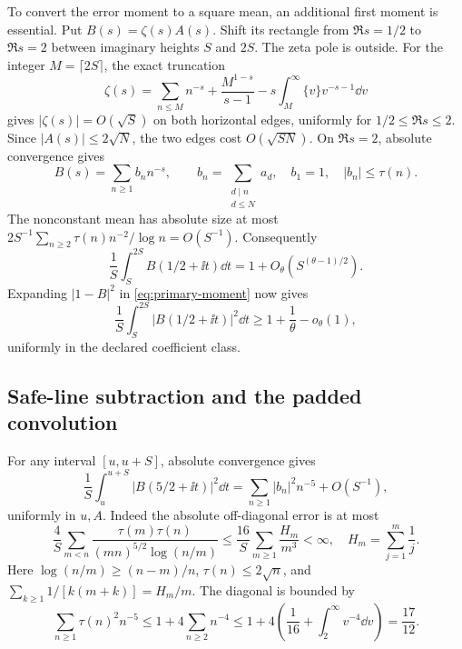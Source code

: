To convert the error moment to a square mean, an additional first
moment is essential. Put \(B(s)=\zeta(s)A(s)\).
Shift its rectangle from \(\Re s=1/2\) to \(\Re s=2\) between
imaginary heights \(S\) and \(2S\). The zeta pole is outside.
For the integer \(M=\lceil2S\rceil\), the exact truncation
\[
 \zeta(s)=\sum_{n\le M}n^{-s}+\frac{M^{1-s}}{s-1}
         -s\int_M^\infty\{v\}v^{-s-1}\dd v
\]
gives \(|\zeta(s)|=O(\sqrt S)\) on both horizontal edges,
uniformly for \(1/2\le\Re s\le2\). Since \(|A(s)|\le2\sqrt N\),
the two edges cost \(O(\sqrt{SN})\).
On \(\Re s=2\), absolute convergence gives
\[
 B(s)=\sum_{n\ge1}b_nn^{-s},\qquad
 b_n=\sum_{\substack{d\mid n\\d\le N}}a_d,\quad b_1=1,\quad
 |b_n|\le\tau(n).
\]
The nonconstant mean has absolute size at most
\(2S^{-1}\sum_{n\ge2}\tau(n)n^{-2}/\log n=O(S^{-1})\).
Consequently
\begin{equation}\label{eq:first-moment}
 \frac1S\int_S^{2S}B(1/2+\ii t)\dd t
 =1+O_\theta(S^{(\theta-1)/2}).
\end{equation}
Expanding \(|1-B|^2\) in \eqref{eq:primary-moment} now gives
\begin{equation}\label{eq:square-mean}
 \frac1S\int_S^{2S}|B(1/2+\ii t)|^2\dd t
 \ge1+\frac1\theta-o_\theta(1),
\end{equation}
uniformly in the declared coefficient class.

\subsection{Safe-line subtraction and the padded convolution}

For any interval \([u,u+S]\), absolute convergence gives
\begin{equation}\label{eq:safe-mean}
 \frac1S\int_u^{u+S}|B(5/2+\ii t)|^2\dd t
 =\sum_{n\ge1}|b_n|^2n^{-5}+O(S^{-1}),
\end{equation}
uniformly in \(u,A\).
Indeed the absolute off-diagonal error is at most
\[
 \frac4S\sum_{m<n}
 \frac{\tau(m)\tau(n)}{(mn)^{5/2}\log(n/m)}
 \le\frac{16}S\sum_{m\ge1}\frac{H_m}{m^3}<\infty,
 \quad H_m=\sum_{j=1}^m\frac1j.
\]
Here \(\log(n/m)\ge(n-m)/n\), \(\tau(n)\le2\sqrt n\), and
\(\sum_{k\ge1}1/[k(m+k)]=H_m/m\).
The diagonal is bounded by
\begin{equation}\label{eq:diagonal}
 \sum_{n\ge1}\tau(n)^2n^{-5}
 \le1+4\sum_{n\ge2}n^{-4}
 \le1+4\left(\frac1{16}+\int_2^\infty v^{-4}\dd v\right)
 =\frac{17}{12}.
\end{equation}

